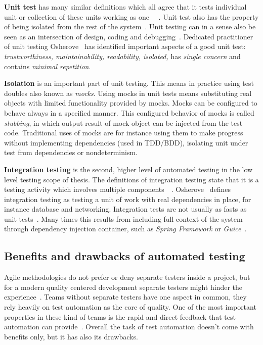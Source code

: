    \textbf{Unit test} has many similar definitions which all agree that it tests individual unit or collection of these units working as one
    ~\cite{runeson2006survey}~\cite{whittaker2000software}. Unit test also has the property of being isolated from the rest
    of the system~\cite{whittaker2000software}. Unit testing can in a sense also be seen as an intersection of design,
    coding and debugging~\cite{langr2015pragmatic}.
    Dedicated practitioner of unit testing Osherove~\cite{artofunit2013} has identified important aspects of a good unit test:
    \textit{trustworthiness, maintainability, readability, isolated,} has \textit{single concern} and contains \textit{minimal repetition}.

    \textbf{Isolation} is an important part of unit testing. This means in practice using test doubles also known as \textit{mocks}.
    Using mocks in unit tests means substituting real objects with limited functionality provided by mocks. Mocks can be
    configured to behave always in a specified manner. This configured behavior of mocks is called \textit{stubbing},
    in which output result of mock object can be injected from the test code. Traditional uses of mocks are for instance using
    them to make progress without implementing dependencies (used in TDD/BDD), isolating unit under test from dependencies
    or nondeterminism. ~\cite{chelimsky2010rspec}

    \textbf{Integration testing} is the second, higher level of automated testing in the low level testing scope of thesis.
    The definitions of integration testing state that it is a testing
    activity which involves multiple components~\cite{whittaker2000software}~\cite{artofunit2013}. Osherove~\cite{artofunit2013}
    defines integration testing as testing a unit of work with real dependencies in place, for instance database and  networking.
    Integration tests are not usually as fasts as unit tests~\cite{artofunit2013}. Many times this results from including
    full context of the system through dependency injection container, such as \textit{Spring Framework} or \textit{Guice}~\cite{kapelonis2016java}.

    \subsection{Benefits and drawbacks of automated testing}
    Agile methodologies do not prefer or deny separate testers inside a project, but for a modern quality centered
    development separate testers might hinder the experience~\cite{prechelt2016quality}. Teams without separate testers have one aspect in common,
    they rely heavily on test automation as the core of quality. One of the most important properties in these kind of
    teams is the rapid and direct feedback that test automation can provide~\cite{prechelt2016quality}. Overall the task of test automation
    doesn't come with benefits only, but it has also its drawbacks.

